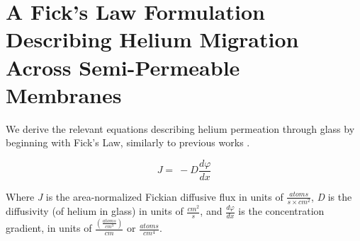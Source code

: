 %
%

\section{A Fick's Law Formulation Describing Helium Migration Across
Semi-Permeable Membranes}\label{a-ficks-law-formulation}

We derive the relevant equations describing helium permeation through
glass by beginning with Fick's Law, similarly to previous works
\citep{rogers1954,altemose1961}.

\begin{equation}
J = \  - D\frac{d\varphi}{dx}
\label{eq:s1-1}
\end{equation}

Where \emph{J} is the area-normalized Fickian diffusive flux in units of
\(\frac{atoms}{s \times cm^{2}}\), \emph{D} is the diffusivity (of
helium in glass) in units of \(\frac{cm^{2}}{s}\), and
\(\frac{d\varphi}{dx}\) is the concentration gradient, in units of
\(\frac{\left( \frac{atoms}{cm^{3}} \right)}{cm}\) or
\(\frac{atoms}{cm^{4}}\).

